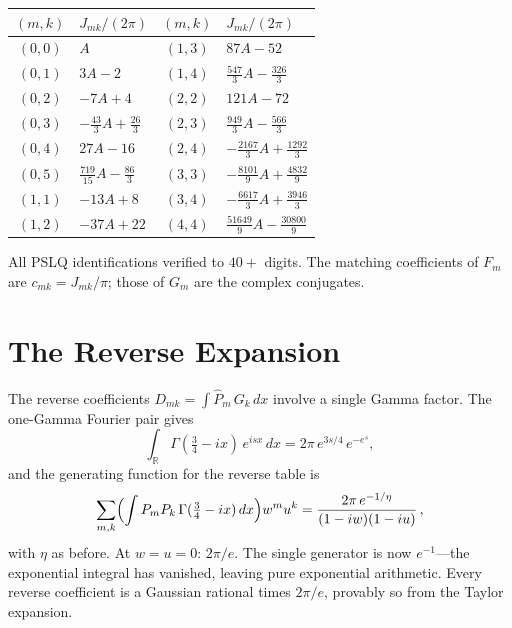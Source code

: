 \documentclass[11pt,a4paper]{article}
\newcommand{\R}{\mathbb{R}}
\begin{document}
\begin{table}[ht]
\centering
\small
\begin{tabular}{cl@{\qquad}cl}
\toprule
$(m,k)$ & $J_{mk}/(2\pi)$ & $(m,k)$ & $J_{mk}/(2\pi)$ \\
\midrule
$(0,0)$ & $A$                         & $(1,3)$ & $87A - 52$ \\
$(0,1)$ & $3A - 2$                    & $(1,4)$ & $\tfrac{547}{3}A - \tfrac{326}{3}$ \\
$(0,2)$ & $-7A + 4$                   & $(2,2)$ & $121A - 72$ \\
$(0,3)$ & $-\tfrac{43}{3}A + \tfrac{26}{3}$  & $(2,3)$ & $\tfrac{949}{3}A - \tfrac{566}{3}$ \\
$(0,4)$ & $27A - 16$                  & $(2,4)$ & $-\tfrac{2167}{3}A + \tfrac{1292}{3}$ \\
$(0,5)$ & $\tfrac{719}{15}A - \tfrac{86}{3}$ & $(3,3)$ & $-\tfrac{8101}{9}A + \tfrac{4832}{9}$ \\
$(1,1)$ & $-13A + 8$                  & $(3,4)$ & $-\tfrac{6617}{3}A + \tfrac{3946}{3}$ \\
$(1,2)$ & $-37A + 22$                 & $(4,4)$ & $\tfrac{51649}{9}A - \tfrac{30800}{9}$ \\
\bottomrule
\end{tabular}
\end{table}

All PSLQ identifications verified to $40+$ digits.  The matching
coefficients of $F_m$ are $c_{mk} = J_{mk}/\pi$; those of $G_m$
are the complex conjugates.

\section{The Reverse Expansion}

The reverse coefficients
$D_{mk} = \int \widehat{P}_m\,G_k\,dx$
involve a single Gamma factor.  The one-Gamma Fourier pair gives
\[
  \int_\R \Gamma(\tfrac34 - ix)\,e^{isx}\,dx
  = 2\pi\,e^{3s/4}\,e^{-e^s},
\]
and the generating function for the reverse table is
\begin{equation}\label{eq:gfrev}
  \sum_{m,k} \Bigl(\int P_m P_k\,\Gamma(\tfrac34-ix)\,dx\Bigr)
  w^m u^k
  = \frac{2\pi\,e^{-1/\eta}}{(1-iw)(1-iu)}\,,
\end{equation}
with $\eta$ as before.  At $w = u = 0$: $2\pi/e$.  The single
generator is now $e^{-1}$---the exponential integral has vanished,
leaving pure exponential arithmetic.  Every reverse coefficient
is a Gaussian rational times $2\pi/e$, provably so from the
Taylor expansion.
\end{document}
